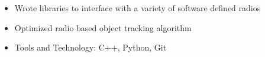 \begin{itemize}
    \setlength\itemsep{0pt}
    \setlength{\parskip}{0pt}
    \item Wrote libraries to interface with a variety of software defined radios
    \item Optimized radio based object tracking algorithm
    \item Tools and Technology: C++, Python, Git
\end{itemize}

